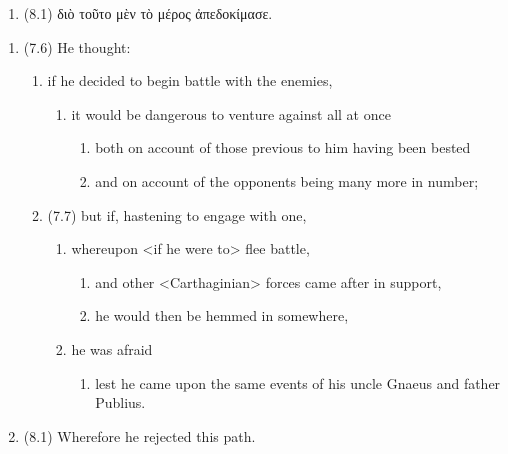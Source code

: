 \documentclass[12pt,letterpaper,oneside,final]{memoir}
\begin{document}
\begin{greek}
\begin{enumerate}
\begin{enumerate}
\begin{enumerate}
\begin{enumerate}
      \end{enumerate}
    \end{enumerate}
  \end{enumerate}
\item (8.1) διὸ τοῦτο μὲν τὸ μέρος ἀπεδοκίμασε.
\end{enumerate} \DoubleSpacing \end{greek} \begin{enumerate} \SingleSpacing 
\item (7.6) He thought: 
  \begin{enumerate} 
  \item if he decided to begin battle with the enemies, 
    \begin{enumerate} 
    \item it would be dangerous to venture against all at once 
      \begin{enumerate}
      \item both on account of those previous to him having been bested 
      \item and on account of the opponents being many more in number; 
      \end{enumerate}
    \end{enumerate}
  \item (7.7) but if, hastening to engage with one,
    \begin{enumerate}
    \item whereupon <if he were to> flee battle, 
      \begin{enumerate}
      \item and other <Carthaginian> forces came after in support,
      \item he would then be hemmed in somewhere,  
      \end{enumerate}
    \item he was afraid 
      \begin{enumerate}
      \item lest he came upon the same events of his uncle Gnaeus and father Publius.
      \end{enumerate}
    \end{enumerate}
  \end{enumerate}
\item (8.1) Wherefore he rejected this path.
\end{enumerate} \DoubleSpacing 
\end{document}
